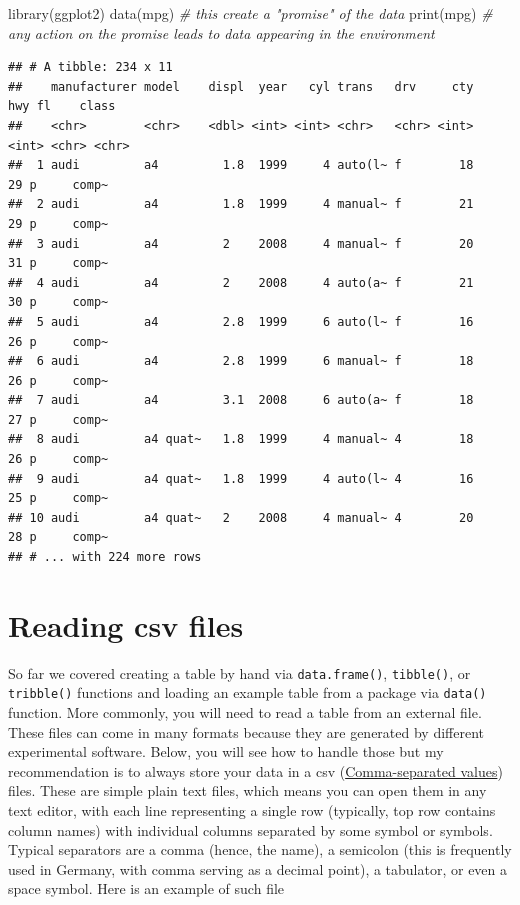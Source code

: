 \documentclass[
]{book}
\newenvironment{Shaded}{\begin{snugshade}}{\end{snugshade}}
\newcommand{\CommentTok}[1]{\textcolor[rgb]{0.56,0.35,0.01}{\textit{#1}}}
\newcommand{\FunctionTok}[1]{\textcolor[rgb]{0.00,0.00,0.00}{#1}}
\newcommand{\NormalTok}[1]{#1}
\begin{document}
\begin{Shaded}
\begin{Highlighting}[]
\FunctionTok{library}\NormalTok{(ggplot2)}
\FunctionTok{data}\NormalTok{(mpg) }\CommentTok{\# this create a "promise" of the data}
\FunctionTok{print}\NormalTok{(mpg) }\CommentTok{\# any action on the promise leads to data appearing in the environment}
\end{Highlighting}
\end{Shaded}

\begin{verbatim}
## # A tibble: 234 x 11
##    manufacturer model    displ  year   cyl trans   drv     cty   hwy fl    class
##    <chr>        <chr>    <dbl> <int> <int> <chr>   <chr> <int> <int> <chr> <chr>
##  1 audi         a4         1.8  1999     4 auto(l~ f        18    29 p     comp~
##  2 audi         a4         1.8  1999     4 manual~ f        21    29 p     comp~
##  3 audi         a4         2    2008     4 manual~ f        20    31 p     comp~
##  4 audi         a4         2    2008     4 auto(a~ f        21    30 p     comp~
##  5 audi         a4         2.8  1999     6 auto(l~ f        16    26 p     comp~
##  6 audi         a4         2.8  1999     6 manual~ f        18    26 p     comp~
##  7 audi         a4         3.1  2008     6 auto(a~ f        18    27 p     comp~
##  8 audi         a4 quat~   1.8  1999     4 manual~ 4        18    26 p     comp~
##  9 audi         a4 quat~   1.8  1999     4 auto(l~ 4        16    25 p     comp~
## 10 audi         a4 quat~   2    2008     4 manual~ 4        20    28 p     comp~
## # ... with 224 more rows
\end{verbatim}

\hypertarget{readr}{%
\section{Reading csv files}\label{readr}}

So far we covered creating a table by hand via \texttt{data.frame()}, \texttt{tibble()}, or \texttt{tribble()} functions and loading an example table from a package via \texttt{data()} function. More commonly, you will need to read a table from an external file. These files can come in many formats because they are generated by different experimental software. Below, you will see how to handle those but my recommendation is to always store your data in a csv (\href{https://en.wikipedia.org/wiki/Comma-separated_values}{Comma-separated values}) files. These are simple plain text files, which means you can open them in any text editor, with each line representing a single row (typically, top row contains column names) with individual columns separated by some symbol or symbols. Typical separators are a comma (hence, the name), a semicolon (this is frequently used in Germany, with comma serving as a decimal point), a tabulator, or even a space symbol. Here is an example of such file
\end{document}
